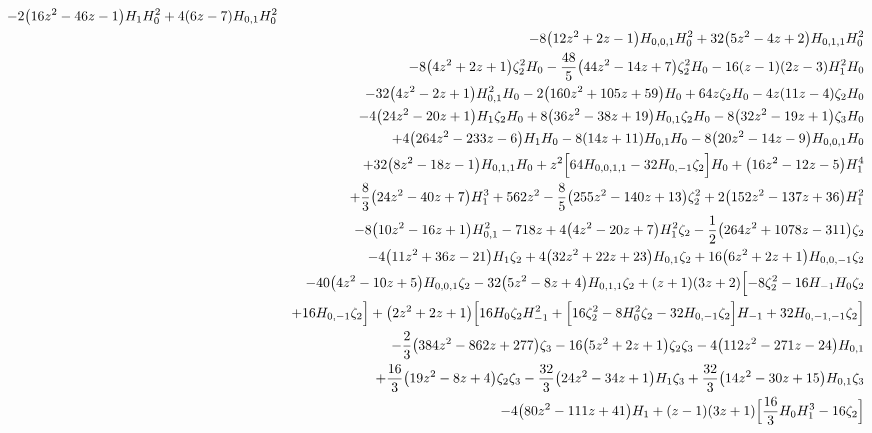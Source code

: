 \begin{eqnarray}
-2 \big(16 z^2-46 z-1\big) H_1 H_0^2
+4 (6 z-7)H_{0,1} H_0^2
\nonumber \\ &&
-8 \big(12 z^2+2 z-1\big) H_{0,0,1} H_0^2+32 \big(5 z^2-4z+2\big) H_{0,1,1} H_0^2
\nonumber \\ &&
-8  \big(4 z^2+2 z+1\big) \zeta_2^2H_0-\frac{48}{5} \big(44 z^2-14 z+7\big) \zeta_2^2 H_0-16 (z-1) (2 z-3)H_1^2 H_0
\nonumber \\ &&
-32 \big(4 z^2-2 z+1\big) H_{0,1}^2 H_0-2 \big(160 z^2+105 z+59\big)H_0+64  z \zeta_2 H_0-4 z (11 z-4) \zeta_2 H_0
\nonumber \\ &&
-4 \big(24z^2-20 z+1\big) H_1 \zeta_2 H_0+8 \big(36 z^2-38 z+19\big) H_{0,1}\zeta_2 H_0-8 \big(32 z^2-19 z+1\big) \zeta_3 H_0
\nonumber \\ &&
+4 \big(264 z^2-233z-6\big) H_1 H_0-8 (14 z+11) H_{0,1} H_0-8 \big(20 z^2-14 z-9\big) H_{0,0,1}H_0
\nonumber \\ &&
+32 \big(8 z^2-18 z-1\big) H_{0,1,1} H_0+z^2 \Bigl[64 H_{0,0,1,1}-32 H_{0,-1} \zeta_2\Bigr] H_0+\big(16 z^2-12 z-5\big) H_1^4
\nonumber \\ &&
+\frac{8}{3}\big(24 z^2-40 z+7\big) H_1^3+562 z^2-\frac{8}{5} \big(255 z^2-140 z+13\big)\zeta_2^2+2 \big(152 z^2-137 z+36\big) H_1^2
\nonumber \\ &&
-8 \big(10 z^2-16 z+1\big)H_{0,1}^2-718 z+4 \big(4 z^2-20 z+7\big) H_1^2 \zeta_2-\frac{1}{2}\big(264 z^2+1078 z-311\big) \zeta_2
\nonumber \\ &&
-4 \big(11 z^2+36 z-21\big) H_1\zeta_2+4 \big(32 z^2+22 z+23\big) H_{0,1} \zeta_2
+16  \big(6z^2+2 z+1\big) H_{0,0,-1} \zeta_2
\nonumber \\ &&
-40 \big(4 z^2-10 z+5\big) H_{0,0,1}\zeta_2
-32 \big(5 z^2-8 z+4\big) H_{0,1,1} \zeta_2+(z+1) (3 z+2)\Bigl[-8  \zeta_2^2-16  H_{-1} H_0 \zeta_2
\nonumber \\ &&
+16 H_{0,-1} \zeta_2\Bigr]+\big(2 z^2+2 z+1\big) \Bigl[16  H_0 \zeta_2 H_{-1}^2+\Bigl[16  \zeta_2^2
-8  H_0^2 \zeta_2-32 H_{0,-1} \zeta_2\Bigr] H_{-1}+32  H_{0,-1,-1} \zeta_2\Bigr]
\nonumber \\ &&
-\frac{2}{3} \big(384 z^2-862 z+277\big) \zeta_3-16  \big(5z^2+2 z+1\big) \zeta_2 \zeta_3
-4 \big(112 z^2-271 z-24\big) H_{0,1}
\nonumber \\ &&
+\frac{16}{3} \big(19 z^2-8 z+4\big)\zeta_2 \zeta_3-\frac{32}{3} \big(24 z^2-34 z+1\big) H_1 \zeta_3+\frac{32}{3} \big(14 z^2-30 z+15\big) H_{0,1} \zeta_3
\nonumber \\ &&
-4 \big(80 z^2-111z+41\big) H_1+(z-1) (3 z+1) \Bigl[\frac{16}{3} H_0 H_1^3-16  \zeta_2\Bigr]

\end{eqnarray}
